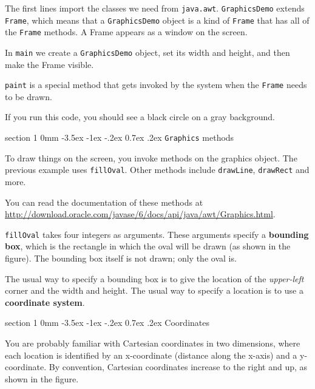 \documentclass{book}
\makeatletter
\renewcommand{\section}{\@startsection 
    {section} {1} {0mm}%
    {-3.5ex \@plus -1ex \@minus -.2ex}%
    {0.7ex \@plus.2ex}%
    {\normalfont\Large\bfseries}}
\makeatother
\begin{document}
The first lines import the classes we need from {\tt java.awt}.
{\tt GraphicsDemo} extends {\tt Frame}, which means that a
{\tt GraphicsDemo} object is a kind of {\tt Frame} that has
all of the {\tt Frame} methods.  A Frame appears as a window on
the screen.

In {\tt main} we create a {\tt GraphicsDemo} object, set its width
and height, and then make the Frame visible.

{\tt paint} is a special method that gets invoked by the system
when the {\tt Frame} needs to be drawn.

If you run this code, you should see a black circle on a gray
background.


\section{{\tt Graphics} methods}

To draw things on the screen, you invoke methods on the
graphics object.  The previous example uses {\tt fillOval}.
Other methods include {\tt drawLine}, {\tt drawRect} and more.

You can read the documentation of these methods at
\url{http://download.oracle.com/javase/6/docs/api/java/awt/Graphics.html}.

{\tt fillOval} takes four integers as arguments.
These arguments specify a {\bf bounding box}, which is the rectangle
in which the oval will be drawn (as shown in the figure).  The
bounding box itself is not drawn; only the oval is.





The usual way to specify a bounding box is to
give the location of the {\em upper-left} corner and the width
and height.  The usual way to specify a location is to use a
{\bf coordinate system}.


\section{Coordinates}

You are probably familiar with Cartesian coordinates in two
dimensions, where each location is identified by an x-coordinate
(distance along the x-axis) and a y-coordinate.  By convention,
Cartesian coordinates increase to the right and up, as shown in the
figure.
\end{document}
